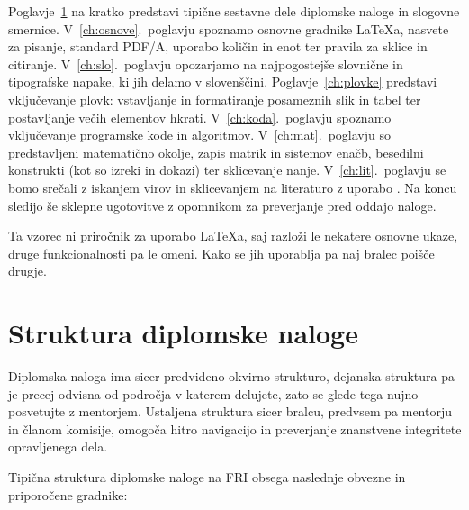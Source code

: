 \documentclass[a4paper,12pt,openright]{book}
\begin{document}
Poglavje~\ref{ch:struktura} na kratko predstavi tipične sestavne dele diplomske naloge in slogovne smernice.
V~\ref{ch:osnove}.~poglavju spoznamo osnovne gradnike \LaTeX{a}, nasvete za pisanje, standard PDF/A, uporabo količin in enot ter pravila za sklice in citiranje.
V~\ref{ch:slo}.~poglavju opozarjamo na najpogostejše slovnične in tipografske napake, ki jih delamo v slovenščini.
Poglavje~\ref{ch:plovke} predstavi vključevanje plovk: vstavljanje in formatiranje posameznih slik in tabel ter postavljanje večih elementov hkrati.
V~\ref{ch:koda}.~poglavju spoznamo vključevanje programske kode in algoritmov.
V~\ref{ch:mat}.~poglavju so predstavljeni matematično okolje, zapis matrik in sistemov enačb, besedilni konstrukti (kot so izreki in dokazi) ter sklicevanje nanje.
V~\ref{ch:lit}.~poglavju se bomo srečali z iskanjem virov in sklicevanjem na literaturo z uporabo .
Na koncu sledijo še sklepne ugotovitve z opomnikom za preverjanje pred oddajo naloge.

Ta vzorec ni priročnik za uporabo \LaTeX{a}, saj razloži le nekatere osnovne ukaze, druge funkcionalnosti pa le omeni. Kako se jih uporablja
pa naj bralec poišče drugje.

\chapter{Struktura diplomske naloge}
\label{ch:struktura}

Diplomska naloga ima sicer predvideno okvirno strukturo, dejanska struktura pa je precej odvisna od področja v katerem delujete, zato se glede tega nujno posvetujte z mentorjem. Ustaljena struktura sicer bralcu, predvsem pa mentorju in članom komisije, omogoča hitro navigacijo in preverjanje znanstvene integritete opravljenega dela.

Tipična struktura diplomske naloge na FRI obsega naslednje obvezne in priporočene gradnike:
\end{document}
